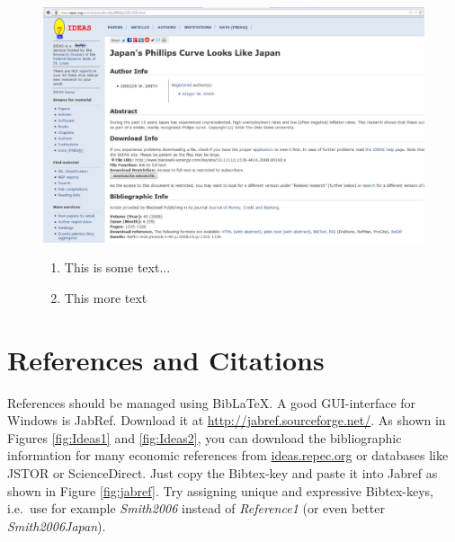 \documentclass[a4paper,12pt]{scrartcl} %
\begin{document}
\begin{figure}[htbp!]
    \begin{minipage}{0.6\linewidth}
        \includegraphics[width=1.0\linewidth]{Ideas}
    \end{minipage}
    \begin{minipage}{0.3\linewidth}
        \begin{enumerate} %
            \item This is some text...
            \item This more text
        \end{enumerate}
    \end{minipage}
\end{figure}



\section{References and Citations}
References should be managed using Bib\LaTeX. A good GUI-interface for Windows is JabRef. Download it at \url{http://jabref.sourceforge.net/}. As shown in Figures \ref{fig:Ideas1} and \ref{fig:Ideas2}, you can download the bibliographic information for many economic references from \url{ideas.repec.org} or databases like JSTOR or ScienceDirect. Just copy the Bibtex-key and paste it into Jabref as shown in Figure \ref{fig:jabref}. Try assigning unique and expressive Bibtex-keys, i.e.\ use for example \textit{Smith2006} instead of \textit{Reference1} (or even better \textit{Smith2006Japan}).
\end{document}
